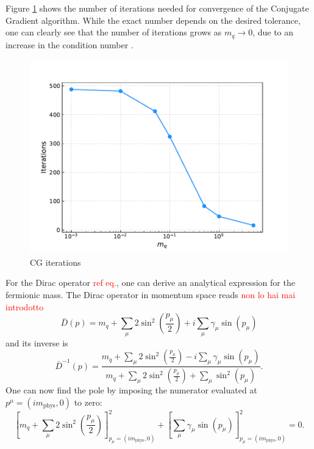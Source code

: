 Figure \ref{fig:correlator_CGiter} shows the number of iterations needed for convergence of the Conjugate Gradient algorithm. While the exact number depends on the desired tolerance, one can clearly see that the number of iterations grows as $m_q \to 0$, due to an increase in the condition number \cite{cond_num_ref}. \\
\begin{figure}[h]
    \centering 
    \includegraphics[scale=0.6]{figures/correlator/CGiter.pdf}
    \caption{CG iterations}
    \label{fig:correlator_CGiter}
\end{figure} 
\newpage
For the Dirac operator \textcolor{red}{ref eq.}, one can derive an analytical expression for the fermionic mass. The Dirac operator in momentum space reads \textcolor{red}{non lo hai mai introdotto}
\begin{equation*}
\bar{D}(p)= m_q + \sum_\mu 2 \sin ^2\left(\frac{p_\mu}{2}\right)+i \sum_\mu \gamma_\mu \sin \left(p_\mu\right)
\end{equation*}
and its inverse is
\begin{equation*}
    \bar{D}^{-1}(p) = \frac{m_q + \sum_\mu 2 \sin ^2\left(\frac{p_\mu}{2}\right) - i \sum_\mu \gamma_\mu \sin \left(p_\mu\right)}{m_q + \sum_\mu 2 \sin^2\left(\frac{p_\mu}{2}\right) + \sum_\mu \sin^2 \left(p_\mu\right)}.
\end{equation*}
One can now find the pole by imposing the numerator evaluated at $p^\mu =(im_\text{phys}, 0)$ to zero:
\begin{equation*}
    \left[m_q + \sum_\mu 2 \sin ^2\left(\frac{p_\mu}{2}\right)\right]^2_{p_\mu = (im_\text{phys}, 0)} + \left[\sum_\mu \gamma_\mu \sin \left(p_\mu\right)\right]^2_{p_\mu = (im_\text{phys}, 0)} = 0.
\end{equation*}

